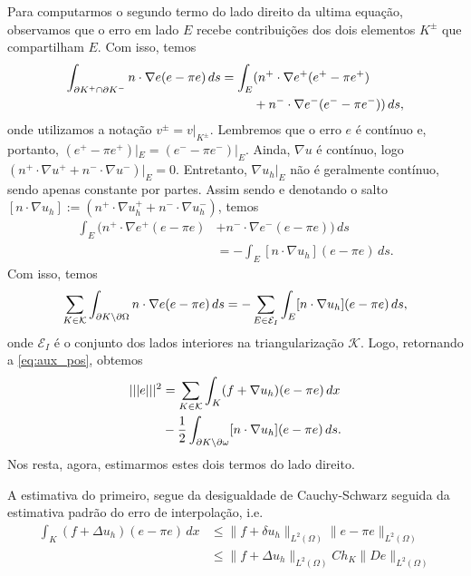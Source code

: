 \begin{dem}
Para computarmos o segundo termo do lado direito da ultima equação, observamos que o erro em lado $E$ recebe contribuições dos dois elementos $K^{\pm}$ que compartilham $E$. Com isso, temos
\begin{align}
  \int_{\partial K^+\cap \partial K^-} n\cdot \nabla e(e - \pi e)\,ds = \int_E &(n^+\cdot \nabla e^+(e^+-\pi e^+) \nonumber\\
  &+ n^-\cdot\nabla e^-(e^--\pi e^-))\,ds,
\end{align}
onde utilizamos a notação $v^\pm = v|_{K^\pm}$. Lembremos que o erro $e$ é contínuo e, portanto, $(e^+-\pi e^+)|_E = (e^--\pi e^-)|_E$. Ainda, $\nabla u$ é contínuo, logo $(n^+\cdot\nabla u^+ + n^-\cdot\nabla u^-)|_E = 0$. Entretanto, $\nabla u_h|_E$ não é geralmente contínuo, sendo apenas constante por partes. Assim sendo e denotando o salto $[n\cdot \nabla u_h] := (n^+\cdot\nabla u_h^+ + n^-\cdot\nabla u_h^-)$, temos
\begin{align}
  \int_E (n^+\cdot \nabla e^+(e-\pi e) &+ n^-\cdot\nabla e^-(e-\pi e))\,ds \nonumber\\
  &= -\int_E [n\cdot\nabla u_h](e-\pi e)\,ds.
\end{align}
Com isso, temos
\begin{align}
  \sum_{K\in\mathcal{K}}\int_{\partial K\setminus\partial\Omega} n\cdot\nabla e(e-\pi e)\,ds = -\sum_{E\in\mathcal{E}_I}\int_E [n\cdot\nabla u_h](e-\pi e)\,ds,
\end{align}
onde $\mathcal{E}_I$ é o conjunto dos lados interiores na triangularização $\mathcal{K}$.
Logo, retornando a \eqref{eq:aux_pos}, obtemos
\begin{align}
  |||e|||^2 &= \sum_{K\in\mathcal{K}}\int_K (f+\nabla u_h)(e-\pi e)\,dx \nonumber\\
  &- \frac{1}{2}\int_{\partial K\setminus\partial \omega} [n\cdot\nabla u_h](e-\pi e)\,ds.
\end{align}
Nos resta, agora, estimarmos estes dois termos do lado direito.

A estimativa do primeiro, segue da desigualdade de Cauchy-Schwarz seguida da estimativa padrão do erro de interpolação, i.e.
\begin{align}
  \int_K (f + \Delta u_h)(e-\pi e)\,dx &\leq \|f+\delta u_h\|_{L^2(\Omega)}\|e-\pi e\|_{L^2(\Omega)}\\
  &\leq \|f + \Delta u_h\|_{L^2(\Omega)}Ch_K\|D e\|_{L^2(\Omega)}\label{eq:aux_pos1}
\end{align}


\end{dem}

